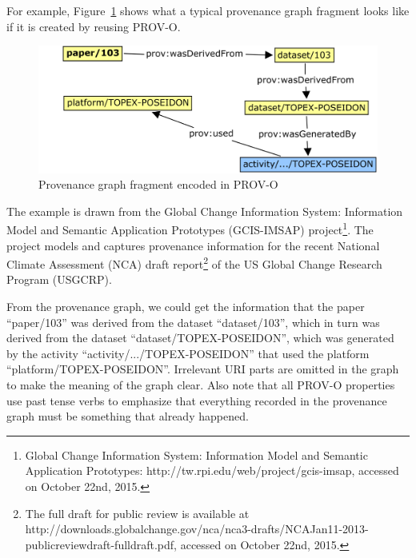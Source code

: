 For example, Figure~\ref{fig:gcis} shows what a typical provenance graph fragment looks like if it is created by reusing PROV-O.
\begin{figure}
	\includegraphics[width=\textwidth]{gcis-prov.png}
	\caption{Provenance graph fragment encoded in PROV-O}
	\label{fig:gcis}
\end{figure}
The example is drawn from the Global Change Information System: Information Model and Semantic Application Prototypes (GCIS-IMSAP) project\footnote{Global Change Information System: Information Model and Semantic Application Prototypes: http://tw.rpi.edu/web/project/gcis-imsap, accessed on October 22nd, 2015.}. The project models and captures provenance information for the recent National Climate Assessment (NCA) draft report\footnote{The full draft for public review is available at http://downloads.globalchange.gov/nca/nca3-drafts/NCAJan11-2013-publicreviewdraft-fulldraft.pdf, accessed on October 22nd, 2015.} of the US Global Change Research Program (USGCRP).

From the provenance graph, we could get the information that the paper ``paper/103'' was derived from the dataset ``dataset/103'', which in turn was derived from the dataset ``dataset/TOPEX-POSEIDON'', which was generated by the activity ``activity/.../TOPEX-POSEIDON'' that used the platform ``platform/TOPEX-POSEIDON''. Irrelevant URI parts are omitted in the graph to make the meaning of the graph clear. Also note that all PROV-O properties use past tense verbs to emphasize that everything recorded in the provenance graph must be something that already happened.

